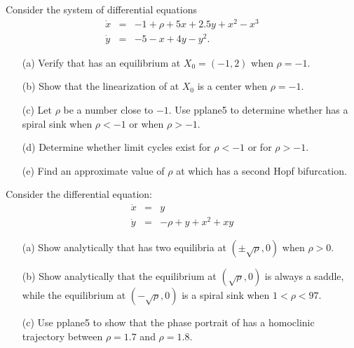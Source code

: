 \documentclass{ximera}
\begin{document}
\begin{exercise} \label{c9.7.4}
Consider the system of differential equations
\begin{equation*}  \label{E:hbifex}
\begin{array}{rcl}
\dot{x} & = & -1 + \rho + 5x + 2.5y + x^2 - x^3 \\
\dot{y} & = & -5 - x + 4y - y^2.  \end{array}
\end{equation*}
\begin{itemize}
\item[(a)]  Verify that  has an equilibrium at $X_0=(-1,2)$ 
when $\rho=-1$.
\item[(b)]  Show that the linearization of  at $X_0$ is a 
center when $\rho=-1$.  
\item[(c)]  Let $\rho$ be a number close to $-1$.  Use {\sf pplane5} to 
determine whether  has a spiral sink when $\rho<-1$ or when 
$\rho>-1$.  
\item[(d)]  Determine whether limit cycles exist for $\rho<-1$ or for 
$\rho>-1$.
\item[(e)]  Find an approximate value of $\rho$ at which 
has a second Hopf bifurcation.
\end{itemize} 
\end{exercise}

\begin{exercise} \label{c9.7.5}
Consider the differential equation:
\begin{equation*} \label{e:homo}
\begin{array}{rcl}
\dot{x} & = &  y \\
\dot{y} & = &  -\rho + y + x^2 + xy
\end{array}
\end{equation*}
\begin{itemize}
\item[(a)]  Show analytically that  has two equilibria at 
$(\pm\sqrt{\rho},0)$ when $\rho>0$. 
\item[(b)]  Show analytically that the equilibrium at $(\sqrt{\rho},0)$ is 
always a saddle, while the equilibrium at $(-\sqrt{\rho},0)$ is a spiral sink 
when $1<\rho<97$.  
\item[(c)]  Use {\sf pplane5} to show that the phase portrait of  
has a homoclinic trajectory between $\rho=1.7$ and $\rho=1.8$.  
\end{itemize}
\end{exercise}
\end{document}
